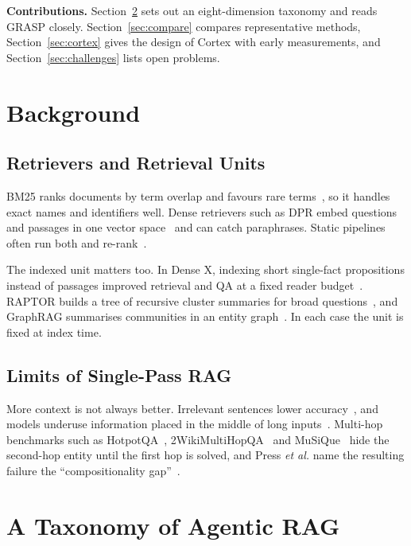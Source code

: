 \documentclass[conference]{IEEEtran}
\begin{document}
\textbf{Contributions.} Section~\ref{sec:taxonomy} sets out an eight-dimension taxonomy and reads GRASP closely. Section~\ref{sec:compare} compares representative methods, Section~\ref{sec:cortex} gives the design of Cortex with early measurements, and Section~\ref{sec:challenges} lists open problems.

\section{Background}

\subsection{Retrievers and Retrieval Units}
BM25 ranks documents by term overlap and favours rare terms~\cite{robertson2009bm25}, so it handles exact names and identifiers well. Dense retrievers such as DPR embed questions and passages in one vector space~\cite{karpukhin2020dpr} and can catch paraphrases. Static pipelines often run both and re-rank~\cite{gao2023ragsurvey}.

The indexed unit matters too. In Dense X, indexing short single-fact propositions instead of passages improved retrieval and QA at a fixed reader budget~\cite{chen2024densex}. RAPTOR builds a tree of recursive cluster summaries for broad questions~\cite{sarthi2024raptor}, and GraphRAG summarises communities in an entity graph~\cite{edge2024graphrag}. In each case the unit is fixed at index time.

\subsection{Limits of Single-Pass RAG}
More context is not always better. Irrelevant sentences lower accuracy~\cite{shi2023distracted}, and models underuse information placed in the middle of long inputs~\cite{liu2024lost}. Multi-hop benchmarks such as HotpotQA~\cite{yang2018hotpotqa}, 2WikiMultiHopQA~\cite{ho2020twowiki} and MuSiQue~\cite{trivedi2022musique} hide the second-hop entity until the first hop is solved, and Press \textit{et al.} name the resulting failure the ``compositionality gap''~\cite{press2023selfask}.

\section{A Taxonomy of Agentic RAG}
\label{sec:taxonomy}
\end{document}
